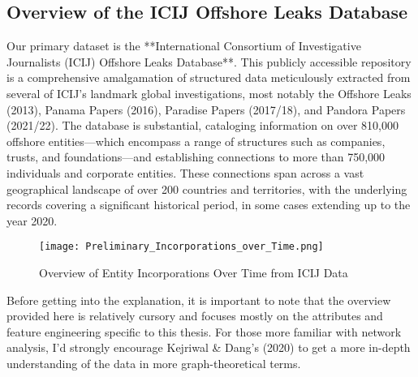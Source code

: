 \subsection{Overview of the ICIJ Offshore Leaks Database}

Our primary dataset is the **International Consortium of Investigative Journalists (ICIJ) Offshore Leaks Database**. This publicly accessible repository is a comprehensive amalgamation of structured data meticulously extracted from several of ICIJ's landmark global investigations, most notably the Offshore Leaks (2013), Panama Papers (2016), Paradise Papers (2017/18), and Pandora Papers (2021/22). The database is substantial, cataloging information on over 810,000 offshore entities—which encompass a range of structures such as companies, trusts, and foundations—and establishing connections to more than 750,000 individuals and corporate entities. These connections span across a vast geographical landscape of over 200 countries and territories, with the underlying records covering a significant historical period, in some cases extending up to the year 2020.

\begin{figure}[htbp]
    \centering
    \texttt{[image: Preliminary\_Incorporations\_over\_Time.png]}
    \caption{Overview of Entity Incorporations Over Time from ICIJ Data}
    \label{fig:incorporations_time}
\end{figure}
Before getting into the explanation, it is important to note that the overview provided here is relatively cursory and focuses mostly on the attributes and feature engineering specific to this thesis. For those more familiar with network analysis, I'd strongly encourage Kejriwal \& Dang's (2020) to get a more in-depth understanding of the data in more graph-theoretical terms.

